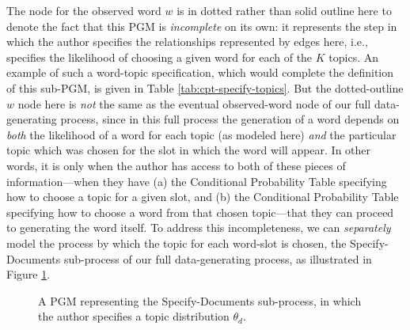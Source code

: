\documentclass[11pt]{article}
\begin{document}
The node for the observed word $w$ is in dotted rather than solid outline here to denote the fact that this PGM is \textit{incomplete} on its own: it represents the step in which the author specifies the relationships represented by edges here, i.e., specifies the likelihood of choosing a given word for each of the $K$ topics. An example of such a word-topic specification, which would complete the definition of this sub-PGM, is given in Table \ref{tab:cpt-specify-topics}. But the dotted-outline $w$ node here is \textit{not} the same as the eventual observed-word node of our full data-generating process, since in this full process the generation of a word depends on \textit{both} the likelihood of a word for each topic (as modeled here) \textit{and} the particular topic which was chosen for the slot in which the word will appear. In other words, it is only when the author has access to both of these pieces of information---when they have (a) the Conditional Probability Table specifying how to choose a topic for a given slot, and (b) the Conditional Probability Table specifying how to choose a word from that chosen topic---that they can proceed to generating the word itself. To address this incompleteness, we can \textit{separately} model the process by which the topic for each word-slot is chosen, the \textsf{Specify-Documents} sub-process of our full data-generating process, as illustrated in Figure \ref{fig:pgm-specify-documents}.



\begin{figure}[ht!]
	\centering
	\caption{A PGM representing the \textsf{Specify-Documents} sub-process, in which the author specifies a topic distribution $\theta_d$.}
	\label{fig:pgm-specify-documents}
\end{figure}
\end{document}
